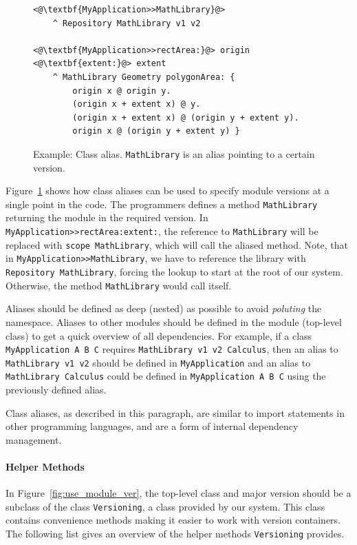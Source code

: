 \begin{figure}[!htp]
\begin{lstlisting}
<@\textbf{MyApplication>>MathLibrary}@>
    ^ Repository MathLibrary v1 v2

<@\textbf{MyApplication>>rectArea:}@> origin <@\textbf{extent:}@> extent
    ^ MathLibrary Geometry polygonArea: { 
        origin x @ origin y.
        (origin x + extent x) @ y.
        (origin x + extent x) @ (origin y + extent y).
        origin x @ (origin y + extent y) }
\end{lstlisting}
\caption[Example: Class alias]{Example: Class alias. \texttt{MathLibrary} is an alias pointing to a certain version.}
\label{fig:use_alias}
\end{figure}

Figure~\ref{fig:use_alias} shows how class aliases can be used to specify module versions at a single point in the code. The programmers defines a method \texttt{MathLibrary} returning the module in the required version. In \texttt{MyApplication>>rectArea:extent:}, the reference to \texttt{MathLibrary} will be replaced with \texttt{scope MathLibrary}, which will call the aliased method. Note, that in \texttt{MyApplication>>MathLibrary}, we have to reference the library with \texttt{Repository MathLibrary}, forcing the lookup to start at the root of our system. Otherwise, the method \texttt{MathLibrary} would call itself.

Aliases should be defined as deep (nested) as possible to avoid \emph{poluting} the namespace. Aliases to other modules should be defined in the module (top-level class) to get a quick overview of all dependencies. For example, if a class \texttt{MyApplication A B C} requires \texttt{MathLibrary v1 v2 Calculus}, then an alias to \texttt{MathLibrary v1 v2} should be defined in \texttt{MyApplication} and an alias to \texttt{MathLibrary Calculus} could be defined in \texttt{MyApplication A B C} using the previously defined alias.

Class aliases, as described in this paragraph, are similar to import statements in other programming languages, and are a form of internal dependency management.

\paragraph{Helper Methods}
In Figure~\ref{fig:use_module_ver}, the top-level class and major version should be a subclass of the class \texttt{Versioning}, a class provided by our system. This class contains convenience methods making it easier to work with version containers. The following list gives an overview of the helper methods \texttt{Versioning} provides.


